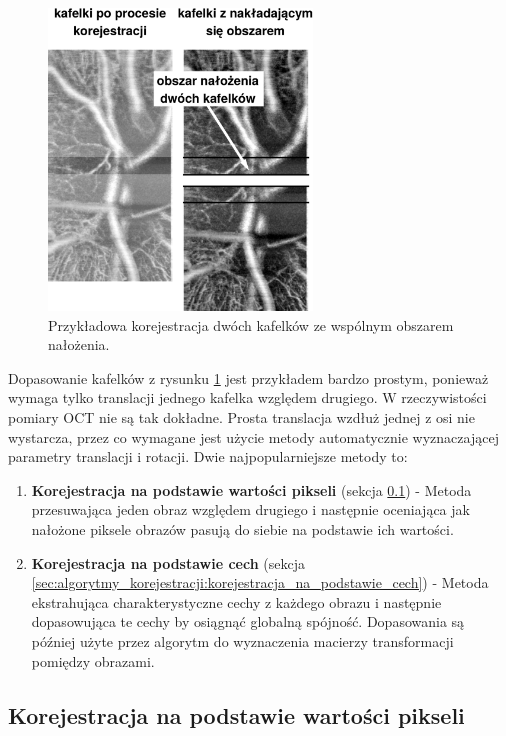 \begin{figure}[H]
  \centering
  \includegraphics[width=7cm]{gfx/align}
  \caption{Przykładowa korejestracja dwóch kafelków ze wspólnym obszarem nałożenia.}
  \label{fig:algorytmy_korejestracji:align}
\end{figure}

Dopasowanie kafelków z rysunku \ref{fig:algorytmy_korejestracji:align} jest przykładem bardzo prostym, ponieważ wymaga tylko translacji jednego kafelka względem drugiego. W rzeczywistości pomiary OCT nie są tak dokładne. Prosta translacja wzdłuż jednej z osi nie wystarcza, przez co wymagane jest użycie metody automatycznie wyznaczającej parametry translacji i rotacji. Dwie najpopularniejsze metody to:

\begin{enumerate}
\item \textbf{Korejestracja na podstawie wartości pikseli} (sekcja \ref{sec:algorytmy_korejestracji:korejestracja_na_podstawie_wartosci}) - Metoda przesuwająca jeden obraz względem drugiego i następnie oceniająca jak nałożone piksele obrazów pasują do siebie na podstawie ich wartości.
\item \textbf{Korejestracja na podstawie cech} (sekcja \ref{sec:algorytmy_korejestracji:korejestracja_na_podstawie_cech}) - Metoda ekstrahująca charakterystyczne cechy z każdego obrazu i następnie dopasowująca te cechy by osiągnąć globalną spójność. Dopasowania są później użyte przez algorytm do wyznaczenia macierzy transformacji pomiędzy obrazami.
\end{enumerate}

\subsection{Korejestracja na podstawie wartości pikseli}
\label{sec:algorytmy_korejestracji:korejestracja_na_podstawie_wartosci}

